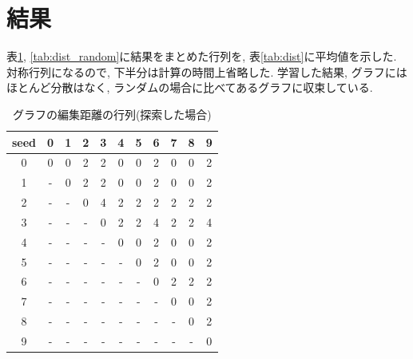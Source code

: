 \documentclass[twocolumn]{jarticle}     %
\begin{document}
\section{結果}

表\ref{tab:dist_forward}, \ref{tab:dist_random}に結果をまとめた行列を, 表\ref{tab:dist}に平均値を示した.
対称行列になるので, 下半分は計算の時間上省略した.
学習した結果, グラフにはほとんど分散はなく, ランダムの場合に比べてあるグラフに収束している.

\begin{table}[tb]
  \begin{center}
    \caption{グラフの編集距離の行列(探索した場合)}
    \begin{tabular}{|c||c|c|c|c|c|c|c|c|c|c|} \hline
      seed & 0 & 1 & 2 & 3 & 4 & 5 & 6 & 7 & 8 & 9 \\ \hline \hline
      0 & 0 & 0 & 2 & 2 & 0 & 0 & 2 & 0 & 0 & 2 \\ \hline
      1 & - & 0 & 2 & 2 & 0 & 0 & 2 & 0 & 0 & 2 \\ \hline
      2 & - & - & 0 & 4 & 2 & 2 & 2 & 2 & 2 & 2 \\ \hline
      3 & - & - & - & 0 & 2 & 2 & 4 & 2 & 2 & 4 \\ \hline
      4 & - & - & - & - & 0 & 0 & 2 & 0 & 0 & 2 \\ \hline
      5 & - & - & - & - & - & 0 & 2 & 0 & 0 & 2 \\ \hline
      6 & - & - & - & - & - & - & 0 & 2 & 2 & 2 \\ \hline
      7 & - & - & - & - & - & - & - & 0 & 0 & 2 \\ \hline
      8 & - & - & - & - & - & - & - & - & 0 & 2 \\ \hline
      9 & - & - & - & - & - & - & - & - & - & 0 \\ \hline
    \end{tabular}
    \label{tab:dist_forward}
  \end{center}
\end{table}
\end{document}
